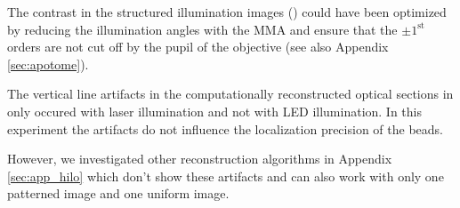 The contrast in the structured illumination images
() could have been optimized by reducing the
illumination angles with the MMA and ensure that the $\pm
1^\textrm{st}$ orders are not cut off by the pupil of the objective
(see also Appendix \ref{sec:apotome}).

The vertical line artifacts in the computationally reconstructed
optical sections in  only occured with laser
illumination and not with LED illumination. In this experiment the
artifacts do not influence the localization precision of the beads.

However, we investigated other reconstruction algorithms in Appendix
\ref{sec:app_hilo} which don't show these artifacts and can also work
with only one patterned image and one uniform image.

